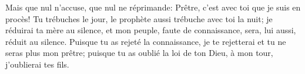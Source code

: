 Mais que nul n’accuse, que nul ne réprimande:
	Prêtre, c’est avec toi que je suis en procès!
Tu trébuches le jour, le prophète aussi trébuche avec toi la nuit;
	je réduirai ta mère au silence,
	et mon peuple, faute de connaissance, sera, lui aussi, réduit au silence.
Puisque tu as rejeté la connaissance,
	je te rejetterai et tu ne seras plus mon prêtre;
	puisque tu as oublié la loi de ton Dieu, à mon tour, j’oublierai tes fils.
